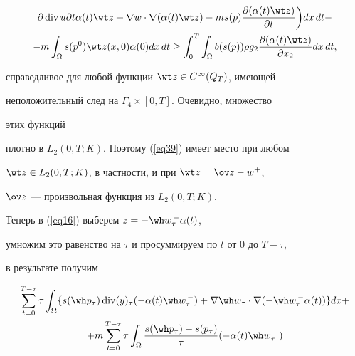\begin{pf}
\begin{multline}
{\partial \Div u}{\partial t} \alpha(t) \wt z + \nabla w


\cdot \nabla (\alpha(t) \wt z) - m s(p)


\frac{\partial (\alpha(t) \wt z)}{\partial t}


\bigg) dx\,dt - \\


%


- m \int_{\Omega} s(p^{0}) \wt z(x,0) \alpha(0) dx\, dt 


\geq \int_{0}^{T} \int 


_{\Omega} b(s(p)) \rho g_{2} \frac{\partial(\alpha(t)


\wt z)}{\partial x_{2}} dx\,dt,


\label{eq39}


\end{multline}


справедливое для любой функции $\wt z \in C^{\infty}(Q_{T})$, имеющей


неположительный след на $\Gamma_{4} \times[0,T]$. Очевидно, множество


этих функций


плотно в $L_{2}(0,T;K)$. Поэтому (\ref{eq39}) имеет место при любом


$\wt z \in L_{2}(0,T;K)$, в частности, и при $\wt z = \ov z-w^{+}$,


$\ov z$ --- произвольная функция из $L_{2}(0,T;K)$.





Теперь в (\ref{eq16}) выберем $z=- \wh w_{\tau}^{\,-} \alpha(t)$,


умножим это равенство на $\tau$ и просуммируем по $t$ от 0 до $T-\tau$,


в результате получим


\begin{multline}


\label{eq42A}


\sum_{t=0}^{T-\tau} \tau \int_{\Omega}\{


s(\wh p_{\tau}) \Div (y)_{\tau} (- \alpha(t) \wh w^{\,-}_{\tau}) +


\nabla \wh w_{\tau} \cdot \nabla(- \wh w^{\,-}_{\tau} \alpha(t))


\} dx + \\


%


+ m \sum_{t=0}^{T-\tau} \tau \int_{\Omega}


\frac{s(\wh p_{\tau})-s(p_{\tau})}{\tau} (- \alpha (t) \wh w^{\,-}_{\tau})



\end{multline}
\end{pf}
